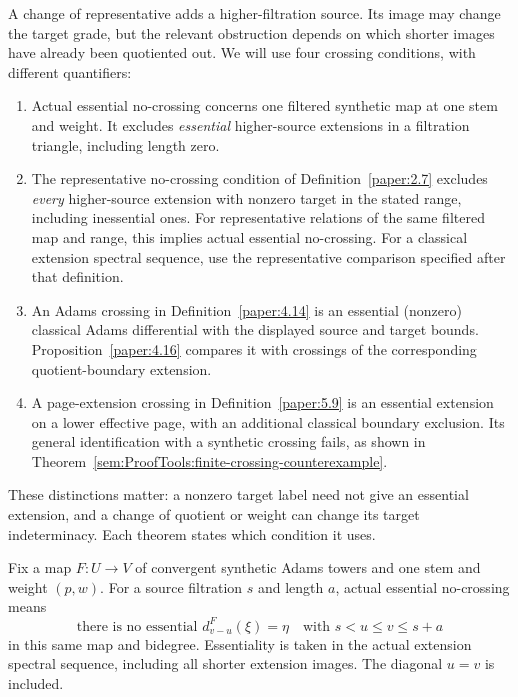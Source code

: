 A change of representative adds a higher-filtration source. Its image
may change the target grade, but the relevant obstruction depends on
which shorter images have already been quotiented out. We will use four
crossing conditions, with different quantifiers:
\begin{enumerate}
\item Actual essential no-crossing concerns one filtered synthetic map at
one stem and weight. It excludes \emph{essential} higher-source
extensions in a filtration triangle, including length zero.
\item The representative no-crossing condition of
Definition~\ref{paper:2.7} excludes \emph{every} higher-source extension
with nonzero target in the stated range, including inessential ones.
For representative relations of the same filtered map and range, this
implies actual essential no-crossing. For a classical extension spectral sequence, use the representative
comparison specified after that definition.
\item An Adams crossing in Definition~\ref{paper:4.14} is an essential
(nonzero) classical Adams differential with the displayed source and target bounds.
Proposition~\ref{paper:4.16} compares it with crossings of the corresponding
quotient-boundary extension.
\item A page-extension crossing in Definition~\ref{paper:5.9} is an
essential extension on a lower effective page, with an additional
classical boundary exclusion. Its general identification with a
synthetic crossing fails, as shown in
Theorem~\ref{sem:ProofTools:finite-crossing-counterexample}.
\end{enumerate}
These distinctions matter: a nonzero target label need not give an
essential extension, and a change of quotient or weight can change its
target indeterminacy. Each theorem states which condition it uses.

\begin{definition}
\label{sem:ProofTools:mh-actual-no-crossing}
Fix a map $F:U\to V$ of convergent synthetic Adams towers and one stem and weight $(p,w)$. For a source filtration $s$ and length $a$, actual essential no-crossing means
\[
\text{there is no essential }d_{v-u}^{F}(\xi)=\eta
\quad\text{with }s<u\leq v\leq s+a
\]
in this same map and bidegree. Essentiality is taken in the actual extension spectral sequence, including all shorter extension images. The diagonal $u=v$ is included.
\end{definition}

